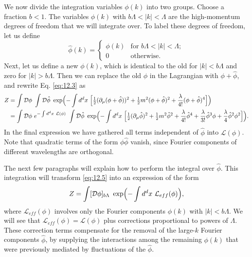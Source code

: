 We now divide the integration variables $\phi(k)$ into two groups.  Choose a
fraction $b < 1$.  The variables $\phi(k)$ with $b\Lambda < |k| < \Lambda$ are
the high-momentum degrees of freedom that we will integrate over.  To label
these degrees of freedom, let us define
\begin{equation}
  \hat{\phi}(k) = \begin{cases}
    \phi(k) & \text{for } b\Lambda < |k| < \Lambda;\\
    0 & \text{otherwise}.
  \end{cases}
\end{equation}
Next, let us define a new $\phi(k)$, which is identical to the old for
$|k| < b\Lambda$ and zero for $|k| > b\Lambda$.  Then we can replace the old
$\phi$ in the Lagrangian with $\phi + \hat{\phi}$, and rewrite Eq.
\eqref{eq:12.3} as
\begin{equation}
  \begin{aligned}
    Z &= \int \mathcal{D}\phi\ \int \mathcal{D}\hat{\phi}\ \exp\Bigl(
      -\int d^dx\ \Bigl[ \tfrac{1}{2}(\partial_\mu(\phi+\hat{\phi}))^2
        + \tfrac{1}{2}m^2(\phi+\hat{\phi})^2 + \frac{\lambda}{4!}
          (\phi+\hat{\phi})^4 \Bigr] \Bigr)\\
    &= \int \mathcal{D}\phi\ e^{-\int d^dx\ \mathcal{L}(\phi)}\ \int
      \mathcal{D}\hat{\phi}\ \exp\Bigl( -\int d^dx\ \Bigl[
        \tfrac{1}{2}(\partial_\mu\hat{\phi})^2 + \tfrac{1}{2}m^2\hat{\phi}^2
        + \frac{\lambda}{4!}\hat{\phi}^4 + \frac{\lambda}{3!}\hat{\phi}^3\phi
        + \frac{\lambda}{4}\hat{\phi}^2\phi^2 \Bigr] \Bigr) .
  \end{aligned}
  \label{eq:12.5}
\end{equation}
In the final expression we have gathered all terms independent of
$\hat{\phi}$ into $\mathcal{L}(\phi)$.  Note that quadratic terms of the form
$\phi\hat{\phi}$ vanish, since Fourier components of different wavelengths are
orthogonal.

The next few paragraphs will explain how to perform the integral over
$\hat{\phi}$.  This integration will transform \eqref{eq:12.5} into an
expression of the form
\begin{equation}
  Z = \int [\mathcal{D}\phi]_{b\Lambda}\ \exp\Bigl( -\int d^dx\
    \mathcal{L}_{eff}(\phi) \Bigr) ,
  \label{eq:12.6}
\end{equation}
where $\mathcal{L}_{eff}(\phi)$ involves only the Fourier components
$\phi(k)$ with $|k| < b\Lambda$.  We will see that $\mathcal{L}_{eff}(\phi) =
\mathcal{L}(\phi)$ plus corrections proportional to powers of $\Lambda$.
These correction terms compensate for the removal of the large-$k$ Fourier
components $\hat{\phi}$, by supplying the interactions among the remaining
$\phi(k)$ that were previously mediated by fluctuations of the
$\hat{\phi}$.

